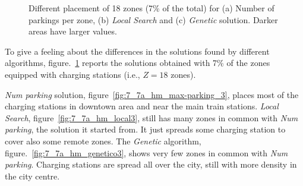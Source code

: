 \begin{figure}[h!]
    \centering     %
    \caption{Different placement of 18 zones (7\% of the total) for (a) Number of parkings per zone, (b) \textit{Local Search}  and (c) \textit{Genetic} solution. Darker areas have larger values.}
    \label{fig:7_7a_maps}
\end{figure}

To give a feeling about the differences in the solutions found by different algorithms, figure.~\ref{fig:7_7a_maps} reports the solutions obtained with 7\% of the zones equipped with charging stations (i.e., $Z=18$ zones).   

\textit{Num parking} solution, figure~\ref{fig:7_7a_hm_max-parking_3}, places most of the charging stations in downtown area and near the main train stations. 
\textit{Local Search}, figure~\ref{fig:7_7a_hm_local3}, still has many zones in common with \textit{Num parking}, the solution it started from. It just spreads some charging station to cover also some remote zones.
The \textit{Genetic} algorithm, figure.~\ref{fig:7_7a_hm_genetico3}, shows very few zones in common with \textit{Num parking}. Charging stations are spread all over the city, still with more density in the city centre. 
 

